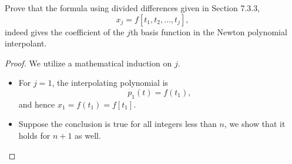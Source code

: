 \begin{pro}
  Prove that the formula using divided differences given in Section
  7.3.3,
  \begin{displaymath}
    x_j = f[t_1, t_2, \ldots, t_j],
  \end{displaymath}
  indeed gives the coefficient of the $j$th basis function
  in the Newton polynomial interpolant.
\end{pro}

\begin{proof}
  We utilize a mathematical induction on $j$.
  \begin{itemize}
  \item
    For $j=1$, the interpolating polynomial is
    \begin{displaymath}
      p_1(t) = f(t_1),
    \end{displaymath}
    and hence $x_1 = f(t_1) = f[t_1]$.

  \item
    Suppose the conclusion is true for all integers less than $n$,
    we show that it holds for $n+1$ as well.
    

\end{itemize}
\end{proof}
